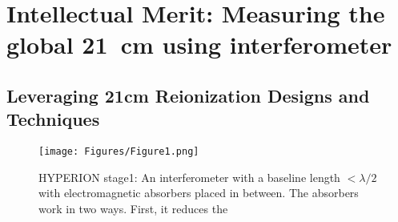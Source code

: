 \documentclass[12pt]{amsart}
\begin{document}
\section{Intellectual Merit: Measuring the global 21~cm using interferometer}
\label{sec:int_mer}






\subsection{Leveraging 21cm Reionization Designs and Techniques}



\begin{figure}[!ht]
\centering
\texttt{[image: Figures/Figure1.png]}
 \caption{\small
HYPERION stage1: An interferometer with a baseline length $< \lambda/2$ with electromagnetic absorbers placed in between. The absorbers work in two ways. First, it reduces the 
}
\label{figure1}
\end{figure}
\end{document}
